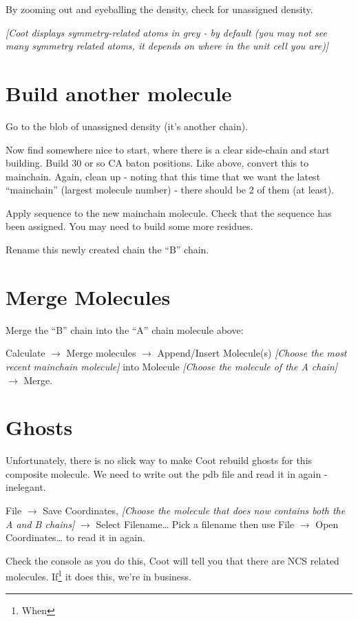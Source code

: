\documentclass{article}
\begin{document}
By zooming out and eyeballing the density, check for unassigned density.

\textsl{ [Coot displays symmetry-related atoms in grey - by default
  (you may not see many symmetry related atoms, it depends on where in
  the unit cell you are)]}


\section{Build another molecule}

Go to the blob of unassigned density (it's another chain).

Now find somewhere nice to start, where there is a clear side-chain
and start building.  Build 30 or so CA baton positions.  Like above,
convert this to mainchain.  Again, clean up - noting that this time
that we want the latest ``mainchain'' (largest molecule number) -
there should be 2 of them (at least).

Apply sequence to the new mainchain molecule.  Check that the sequence
has been assigned.  You may need to build some more residues.

Rename this newly created chain the ``B'' chain.

\section{Merge Molecules}

Merge the ``B'' chain into the ``A'' chain molecule above: 

\textsf{Calculate $\rightarrow$ Merge molecules $\rightarrow$
  Append/Insert Molecule(s) \emph{[Choose the most recent mainchain
    molecule]} into Molecule \emph{[Choose the molecule of the A chain]}
  $\rightarrow$ Merge}.

\section{Ghosts}

Unfortunately, there is no slick way to make Coot rebuild ghosts for
this composite molecule.  We need to write out the pdb file and read
it in again - inelegant.

\textsf{File $\rightarrow$ Save Coordinates, \emph{[Choose the
    molecule that does now contains both the A and B chains]}
  $\rightarrow$ Select Filename\ldots } Pick a filename then use
\textsf{File $\rightarrow$ Open Coordinates\ldots} to read it in
again.

Check the console as you do this, Coot will tell you that there are
NCS related molecules.  If\footnote{When} it does this, we're in
business.
\end{document}
